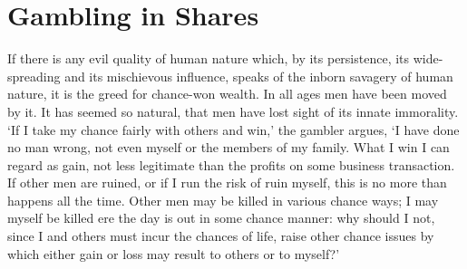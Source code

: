 \documentclass[letterpaper,12pt,oneside,openany]{memoir}
\begin{document}
\chapter{Gambling in Shares}

If there is any evil quality of human nature which, by
its persistence, its wide-spreading and its mischievous
influence, speaks of the inborn savagery of human
nature, it is the greed for chance-won wealth. In all
ages men have been moved by it. It has seemed so
natural, that men have lost sight of its innate immorality.
`If I take my chance fairly with others and
win,' the gambler argues, `I have done no man wrong,
not even myself or the members of my family. What
I win I can regard as gain, not less legitimate than the
profits on some business transaction. If other men are
ruined, or if I run the risk of ruin myself, this is no more
than happens all the time. Other men may be killed
in various chance ways; I may myself be killed ere the
day is out in some chance manner: why should I not,
since I and others must incur the chances of life, raise
other chance issues by which either gain or loss may
result to others or to myself?'
\end{document}
